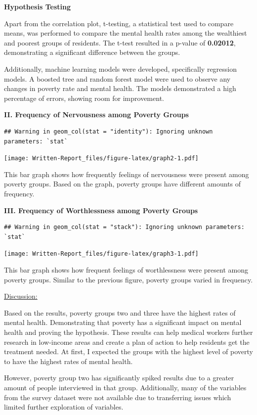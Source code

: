 \documentclass[
]{article}
\begin{document}
\textbf{Hypothesis Testing}

Apart from the correlation plot, t-testing, a statistical test used to
compare means, was performed to compare the mental health rates among
the wealthiest and poorest groups of residents. The t-test resulted in a
p-value of \textbf{0.02012}, demonstrating a significant difference
between the groups.

Additionally, machine learning models were developed, specifically
regression models. A boosted tree and random forest model were used to
observe any changes in poverty rate and mental health. The models
demonstrated a high percentage of errors, showing room for improvement.

\textbf{II. Frequency of Nervousness among Poverty Groups}

\begin{verbatim}
## Warning in geom_col(stat = "identity"): Ignoring unknown parameters: `stat`
\end{verbatim}

\texttt{[image: Written-Report\_files/figure-latex/graph2-1.pdf]}

This bar graph shows how frequently feelings of nervousness were present
among poverty groups. Based on the graph, poverty groups have different
amounts of frequency.

\textbf{III. Frequency of Worthlessness among Poverty Groups}

\begin{verbatim}
## Warning in geom_col(stat = "stack"): Ignoring unknown parameters: `stat`
\end{verbatim}

\texttt{[image: Written-Report\_files/figure-latex/graph3-1.pdf]}

This bar graph shows how frequent feelings of worthlessness were present
among poverty groups. Similar to the previous figure, poverty groups
varied in frequency.

\ul{Discussion:}

Based on the results, poverty groups two and three have the highest
rates of mental health. Demonstrating that poverty has a significant
impact on mental health and proving the hypothesis. These results can
help medical workers further research in low-income areas and create a
plan of action to help residents get the treatment needed. At first, I
expected the groups with the highest level of poverty to have the
highest rates of mental health.

However, poverty group two has significantly spiked results due to a
greater amount of people interviewed in that group. Additionally, many
of the variables from the survey dataset were not available due to
transferring issues which limited further exploration of variables.
\end{document}
